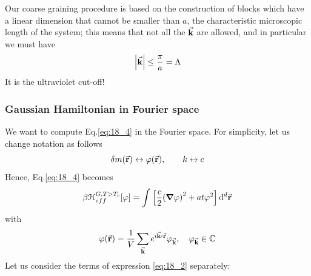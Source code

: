\documentclass[../main/main.tex]{subfiles}
\begin{document}
\begin{remark}
Our coarse graining procedure is based on the construction of blocks which have a linear dimension that cannot be smaller than \( a \), the characteristic microscopic length of the system; this means that not all the \( \va{k} \)  are allowed, and in particular we must have
\begin{equation*}
\abs{\va{k}} \le \frac{\pi }{a} = \Lambda
\end{equation*}
It is the ultraviolet cut-off!
\end{remark}



\subsubsection{Gaussian Hamiltonian in Fourier space}
We want to compute Eq.\eqref{eq:18_4}  in the Fourier space. For simplicity, let us change notation as follows
\begin{equation*}
  \delta m (\va{r}) \leftrightarrow \varphi (\va{r}), \qquad k \leftrightarrow c
\end{equation*}
Hence, Eq.\eqref{eq:18_4} becomes
\begin{equation}
  \beta \mathcal{H}_{eff}^{G,T>T_c} [\varphi ]= \int_{}^{}  \qty[\frac{c}{2} \qty(\grad \varphi )^2 + a t \varphi  ^2 ] \dd[d]{\va{r}}
  \label{eq:18_2}
\end{equation}
with
\begin{equation*}
  \varphi (\va{r}) = \frac{1}{V} \sum_{\va{k}}^{} e^{i \va{k} \vdot \va{r}} \varphi _{\va{k}}, \quad \varphi _{\va{k}} \in \mathbb{C}
\end{equation*}
Let us consider the terms of expression \eqref{eq:18_2} separately:
\end{document}
